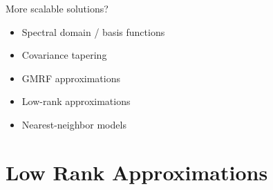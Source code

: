 \documentclass[11pt,ignorenonframetext,]{beamer}
\providecommand{\tightlist}{%
  \setlength{\itemsep}{0pt}\setlength{\parskip}{0pt}}
\begin{document}
\begin{frame}{More scalable solutions?}

\large

\begin{itemize}
\tightlist
\item
  Spectral domain / basis functions
\end{itemize}

\vspace{3mm}

\begin{itemize}
\tightlist
\item
  Covariance tapering
\end{itemize}

\vspace{3mm}

\begin{itemize}
\tightlist
\item
  GMRF approximations
\end{itemize}

\vspace{3mm}

\begin{itemize}
\tightlist
\item
  Low-rank approximations
\end{itemize}

\vspace{3mm}

\begin{itemize}
\tightlist
\item
  Nearest-neighbor models
\end{itemize}

\end{frame}

\section{Low Rank Approximations}\label{low-rank-approximations}
\end{document}

